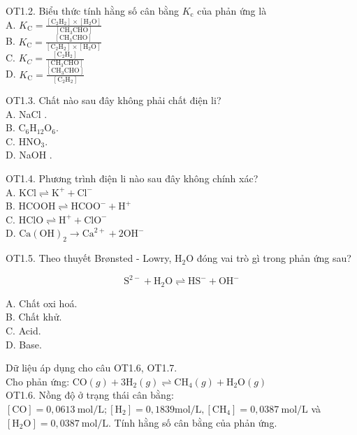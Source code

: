 \documentclass[10pt]{article}
\begin{document}
OT1.2. Biểu thức tính hằng số cân bằng $K_{\mathrm{c}}$ của phản ứng là\\
A. $K_{\mathrm{C}}=\frac{\left[\mathrm{C}_{2} \mathrm{H}_{2}\right] \times\left[\mathrm{H}_{2} \mathrm{O}\right]}{\left[\mathrm{CH}_{3} \mathrm{CHO}\right]}$\\
B. $K_{\mathrm{C}}=\frac{\left[\mathrm{CH}_{3} \mathrm{CHO}\right]}{\left[\mathrm{C}_{2} \mathrm{H}_{2}\right] \times\left[\mathrm{H}_{2} \mathrm{O}\right]}$\\
C. $K_{C}=\frac{\left[\mathrm{C}_{2} \mathrm{H}_{2}\right]}{\left[\mathrm{CH}_{3} \mathrm{CHO}\right]}$\\
D. $K_{\mathrm{C}}=\frac{\left[\mathrm{CH}_{3} \mathrm{CHO}\right]}{\left[\mathrm{C}_{2} \mathrm{H}_{2}\right]}$

OT1.3. Chất nào sau đây không phải chất điện li?\\
A. NaCl .\\
B. $\mathrm{C}_{6} \mathrm{H}_{12} \mathrm{O}_{6}$.\\
C. $\mathrm{HNO}_{3}$.\\
D. NaOH .

OT1.4. Phương trình điện li nào sau đây không chính xác?\\
A. $\mathrm{KCl} \rightleftharpoons \mathrm{K}^{+}+\mathrm{Cl}^{-}$\\
B. $\mathrm{HCOOH} \rightleftharpoons \mathrm{HCOO}^{-}+\mathrm{H}^{+}$\\
C. $\mathrm{HClO} \rightleftharpoons \mathrm{H}^{+}+\mathrm{ClO}^{-}$\\
D. $\mathrm{Ca}(\mathrm{OH})_{2} \rightarrow \mathrm{Ca}^{2+}+2 \mathrm{OH}^{-}$

OT1.5. Theo thuyết Brønsted - Lowry, $\mathrm{H}_{2} \mathrm{O}$ đóng vai trò gì trong phản ứng sau?

$$
\mathrm{S}^{2-}+\mathrm{H}_{2} \mathrm{O} \rightleftharpoons \mathrm{HS}^{-}+\mathrm{OH}^{-}
$$

A. Chất oxi hoá.\\
B. Chất khử.\\
C. Acid.\\
D. Base.

Dữ liệu áp dụng cho câu OT1.6, OT1.7.\\
Cho phản ứng: $\mathrm{CO}(g)+3 \mathrm{H}_{2}(g) \rightleftharpoons \mathrm{CH}_{4}(g)+\mathrm{H}_{2} \mathrm{O}(g)$\\
OT1.6. Nồng độ ở trạng thái cân bằng: $[\mathrm{CO}]=0,0613 \mathrm{~mol} / \mathrm{L} ;\left[\mathrm{H}_{2}\right]=0,1839 \mathrm{mol} / \mathrm{L},\left[\mathrm{CH}_{4}\right]=0,0387 \mathrm{~mol} / \mathrm{L}$ và $\left[\mathrm{H}_{2} \mathrm{O}\right]=0,0387 \mathrm{~mol} / \mathrm{L}$. Tính hằng số cân bằng của phản ứng.
\end{document}
